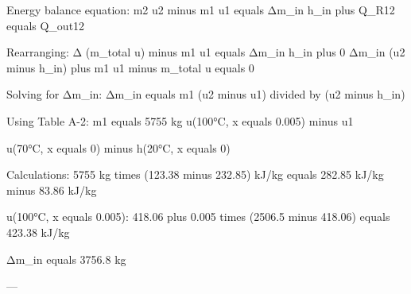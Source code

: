 Energy balance equation:  
m2 u2 minus m1 u1 equals Δm_in h_in plus Q_R12 equals Q_out12  

Rearranging:  
Δ (m_total u) minus m1 u1 equals Δm_in h_in plus 0  
Δm_in (u2 minus h_in) plus m1 u1 minus m_total u equals 0  

Solving for Δm_in:  
Δm_in equals m1 (u2 minus u1) divided by (u2 minus h_in)  

Using Table A-2:  
m1 equals 5755 kg  
u(100°C, x equals 0.005) minus u1  

u(70°C, x equals 0) minus h(20°C, x equals 0)  

Calculations:  
5755 kg times (123.38 minus 232.85) kJ/kg  
equals 282.85 kJ/kg minus 83.86 kJ/kg  

u(100°C, x equals 0.005):  
418.06 plus 0.005 times (2506.5 minus 418.06)  
equals 423.38 kJ/kg  

Δm_in equals 3756.8 kg  

---